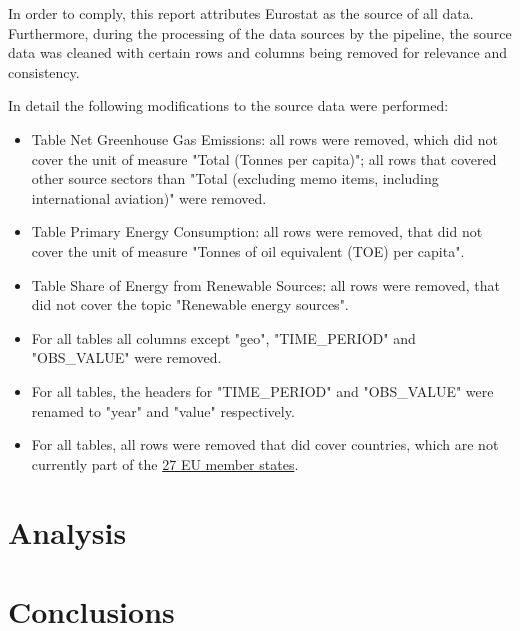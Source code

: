\documentclass{article}
\begin{document}
In order to comply, this report attributes Eurostat as the source of all data.
Furthermore, during the processing of the data sources by the pipeline, the source data was cleaned with certain
rows and columns being removed for relevance and consistency.

In detail the following modifications to the source data were performed:
\begin{itemize}
    \item Table Net Greenhouse Gas Emissions: all rows were removed, which did not cover the unit of measure "Total (Tonnes per capita)";
    all rows that covered other source sectors than "Total (excluding memo items, including international aviation)" were removed.
    \item Table Primary Energy Consumption: all rows were removed, that did not cover the unit of measure "Tonnes of oil equivalent (TOE) per capita".
    \item Table Share of Energy from Renewable Sources: all rows were removed, that did not cover the topic "Renewable energy sources".
    \item For all tables all columns except "geo", "TIME\_PERIOD" and "OBS\_VALUE" were removed.
    \item For all tables, the headers for "TIME\_PERIOD" and "OBS\_VALUE" were renamed to "year" and "value" respectively.
    \item For all tables, all rows were removed that did cover countries, which are not currently part of the \href{https://www.destatis.de/Europa/EN/Country/Country-Codes.html}{27 EU member states}.
\end{itemize}

\section*{Analysis}

\section*{Conclusions}
\end{document}
